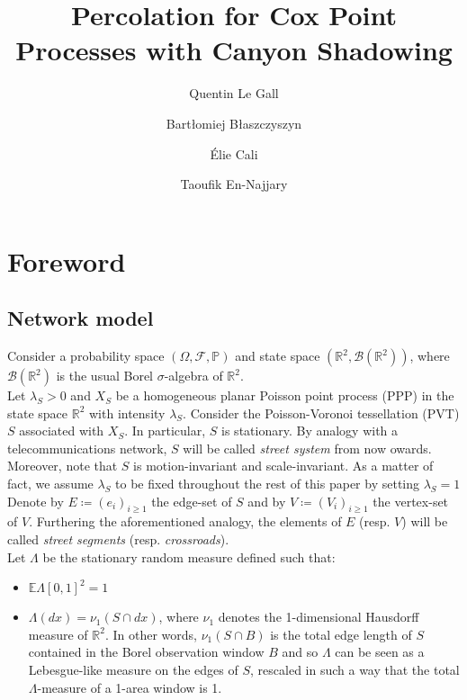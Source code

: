 \documentclass[10pt,a4paper]{amsart}
\theoremstyle{exampstyle}
\theoremstyle{exampnotations}
\begin{document}
\title{Percolation for Cox Point Processes with Canyon Shadowing}
\author[Q. Le Gall]{Quentin Le Gall}
\address{Orange Labs Networks, 44 avenue de la République 92320 Ch\^atillon}
\author[B. B\l{}aszczyszyn] {Bart\l{}omiej B\l{}aszczyszyn}
\address{Inria - \MakeUppercase{ens}, 2 rue Simone Iff CS42112 75589 Paris Cedex 12}
\author[E. Cali]{\'Elie Cali}
\address{Orange Labs Networks, 44 avenue de la République 92320 Ch\^atillon}
\author[T. En-Najjary]{Taoufik En-Najjary}
\address{Orange Labs Networks, 44 avenue de la République 92320 Ch\^atillon}
\maketitle
\tableofcontents
\section{Foreword}
\subsection{Network model}
\label{Ss.NetworkModel}
Consider a probability space $(\Omega, \mathcal{F}, \mathbb{P})$ and state space $(\mathbb{R}^{2}, \mathcal{B}(\mathbb{R}^{2}))$, where $\mathcal{B}(\mathbb{R}^{2})$ is the usual Borel $\sigma$-algebra of $\mathbb{R}^{2}$. \\

Let $\lambda_{S} > 0$ and $X_{S}$ be a homogeneous planar Poisson point process (PPP) in the state space $\mathbb{R}^{2}$ with intensity $\lambda_S$. Consider the Poisson-Voronoi tessellation (PVT) $S$ associated with $X_S$. In particular, $S$ is stationary. By analogy with a telecommunications network, $S$ will be called \emph{street system} from now owards. Moreover, note that $S$ is motion-invariant and scale-invariant. As a matter of fact, we assume $\lambda_S$ to be fixed throughout the rest of this paper by setting $\lambda_S = 1$  \\
\indent Denote by $E \coloneqq (e_{i})_{i \geq 1}$ the edge-set of $S$ and by $V \coloneqq (V_{i})_{i \geq 1}$ the vertex-set of $V$. Furthering the aforementioned analogy, the elements of $E$ (resp. $V$) will be called \emph{street segments} (resp. \emph{crossroads}). \\
\indent Let $\Lambda$ be the stationary random measure defined such that:
\begin{itemize}
\item $\mathbb{E} \Lambda \left[0,1\right]^{2} = 1$
\item $\Lambda(dx) = \nu_{1}(S \cap dx)$, where $\nu_{1}$ denotes the 1-dimensional Hausdorff measure of $\mathbb{R}^{2}$. In other words, $\nu_{1}(S \cap B)$ is the total edge length of $S$ contained in the Borel observation window $B$ and so $\Lambda$ can be seen as a Lebesgue-like measure on the edges of $S$, rescaled in such a way that the total $\Lambda$-measure of a 1-area window is 1. \\
\end{itemize}
\end{document}
